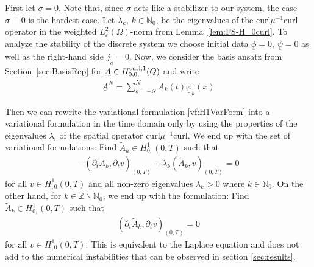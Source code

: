 \documentclass[a4paper,11pt]{article}
\newcommand{\N}{\mathbb N}
\newcommand{\Z}{\mathbb Z}
\renewcommand{\vec}[1]{\underline{#1}}
\begin{document}
First let $\sigma = 0$. Note that, since $\sigma$ acts like a stabilizer to our system, the  case  $\sigma \equiv 0$ is the hardest case. Let $\lambda_k$, $k\in \N_0$, be the eigenvalues of the $\text{curl} \mu^{-1} \text{curl}$ operator in the weighted $L^2_\varepsilon(\Omega)$-norm from Lemma~\ref{lem:FS-H_0curl}. To analyze the stability of the discrete system we choose initial data $\vec \phi=0$, $\vec \psi =0$ as well as the right-hand side $\vec j_a=0$. Now, we consider the basis ansatz from Section~\ref{sec:BasisRep} for $\vec A\in H^{\textmd{curl};1}_{0;0,}(Q)$ and write
\begin{align*}
	\vec A^N = \sum\limits_{k=-N}^N \tilde{A}_k(t)\vec \varphi_k(x)
\end{align*}

Then we can rewrite the variational formulation \eqref{vf:H1VarForm} into a variational formulation in the time domain only by using the properties of the eigenvalues $\lambda_i$ of the spatial operator $\text{curl} \mu^{-1} \text{curl}$. We end up with the set of variational formulations: Find $\tilde{A}_k \in H^1_{0,}(0,T) $ such that
\begin{align}\label{vf:TimeVF}
	-	(\partial_t \tilde{A}_k,\partial_t  v)_{(0,T)}  +\lambda_k	( \tilde{A}_k,  v)_{(0,T)}  = 0
\end{align}
for all  $ v\in  H^1_{,0}(0,T)  $ and all non-zero eigenvalues $\lambda_k>0$ where $k\in\N_0$. On the other hand, for $k\in \Z\backslash \N_0$, we end up with the formulation: Find $\tilde{A}_k \in H^1_{0,}(0,T) $ such that
\begin{align*}
	(\partial_t \tilde{A}_k,\partial_t  v)_{(0,T)} = 0
\end{align*}
for all  $ v\in  H^1_{,0}(0,T)$. This is equivalent to the Laplace equation and does not add to the numerical instabilities that can be observed in section \ref{sec:results}. 
\end{document}
